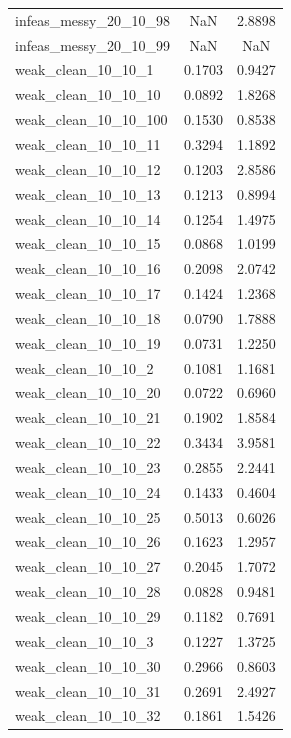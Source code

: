 \begin{longtable}{lcc}
infeas\_messy\_20\_10\_98  &      NaN &  2.8898 \\
infeas\_messy\_20\_10\_99  &      NaN &     NaN \\
weak\_clean\_10\_10\_1     &   0.1703 &  0.9427 \\
weak\_clean\_10\_10\_10    &   0.0892 &  1.8268 \\
weak\_clean\_10\_10\_100   &   0.1530 &  0.8538 \\
weak\_clean\_10\_10\_11    &   0.3294 &  1.1892 \\
weak\_clean\_10\_10\_12    &   0.1203 &  2.8586 \\
weak\_clean\_10\_10\_13    &   0.1213 &  0.8994 \\
weak\_clean\_10\_10\_14    &   0.1254 &  1.4975 \\
weak\_clean\_10\_10\_15    &   0.0868 &  1.0199 \\
weak\_clean\_10\_10\_16    &   0.2098 &  2.0742 \\
weak\_clean\_10\_10\_17    &   0.1424 &  1.2368 \\
weak\_clean\_10\_10\_18    &   0.0790 &  1.7888 \\
weak\_clean\_10\_10\_19    &   0.0731 &  1.2250 \\
weak\_clean\_10\_10\_2     &   0.1081 &  1.1681 \\
weak\_clean\_10\_10\_20    &   0.0722 &  0.6960 \\
weak\_clean\_10\_10\_21    &   0.1902 &  1.8584 \\
weak\_clean\_10\_10\_22    &   0.3434 &  3.9581 \\
weak\_clean\_10\_10\_23    &   0.2855 &  2.2441 \\
weak\_clean\_10\_10\_24    &   0.1433 &  0.4604 \\
weak\_clean\_10\_10\_25    &   0.5013 &  0.6026 \\
weak\_clean\_10\_10\_26    &   0.1623 &  1.2957 \\
weak\_clean\_10\_10\_27    &   0.2045 &  1.7072 \\
weak\_clean\_10\_10\_28    &   0.0828 &  0.9481 \\
weak\_clean\_10\_10\_29    &   0.1182 &  0.7691 \\
weak\_clean\_10\_10\_3     &   0.1227 &  1.3725 \\
weak\_clean\_10\_10\_30    &   0.2966 &  0.8603 \\
weak\_clean\_10\_10\_31    &   0.2691 &  2.4927 \\
weak\_clean\_10\_10\_32    &   0.1861 &  1.5426 \\

\end{longtable}
